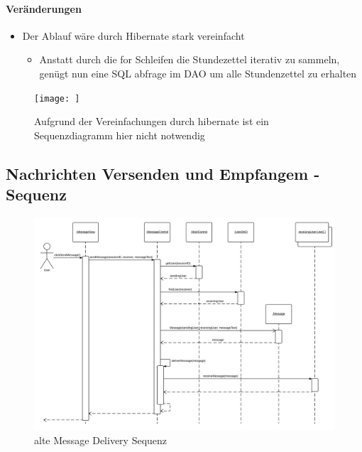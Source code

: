         \paragraph{Veränderungen}
        \begin{itemize}
            \item Der Ablauf wäre durch Hibernate stark vereinfacht
            \begin{itemize}
                \item Anstatt durch die for Schleifen die Stundezettel iterativ zu sammeln, genügt nun eine SQL abfrage im DAO um alle Stundenzettel zu erhalten
            \end{itemize}
        \end{itemize}

        \begin{figure}
          \centering
            \texttt{[image: ]}
           \caption{Aufgrund der Vereinfachungen durch hibernate ist ein Sequenzdiagramm hier nicht notwendig}
        \end{figure}

        \subsection{Nachrichten Versenden und Empfangem - Sequenz}

            \begin{figure}
              \centering
                \includegraphics[width=\linewidth]{Message-Delivery.svg}
               \caption{alte Message Delivery Sequenz}
            \end{figure}

